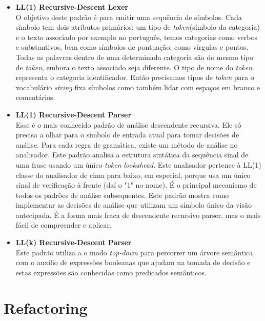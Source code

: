 \begin{itemize}
	\item \textbf{LL(1) Recursive-Descent Lexer}\\
	O objetivo deste padr\~{a}o \'{e} para emitir uma sequência de s\'{i}mbolos. Cada s\'{i}mbolo tem dois atributos prim\'{a}rios: um tipo de \textit{token}(s\'{i}mbolo da categoria) e o texto associado por exemplo 
	no português, temos categorias como verbos e substantivos, bem como s\'{i}mbolos de pontuaç\~{a}o, como v\'{i}rgulas e pontos. Todas as palavras dentro de uma determinada categoria s\~{a}o do mesmo tipo de \textit{token}, embora o texto associado seja diferente. O tipo de nome do \textit{token} representa o categoria identificador. Ent\~{a}o precisamos tipos de \textit{token} para o vocabul\'{a}rio \textit{string} fixa s\'{i}mbolos como tamb\'{e}m lidar com espaços em branco e coment\'{a}rios.
	\item \textbf{LL(1) Recursive-Descent Parser}\\
	Esse \'{e} o mais conhecido padr\~{a}o de an\'{a}lise descendente recursiva. Ele s\'{o} precisa	a olhar para o s\'{i}mbolo de entrada atual para tomar decis\~{o}es de an\'{a}lise. Para cada regra de gram\'{a}tica, existe um m\'{e}todo de an\'{a}lise no analisador. Este padr\~{a}o analisa a estrutura sint\'{a}tica da sequência sinal de uma frase usando um \'{u}nico \textit{token} \textit{lookahead}. Este analisador pertence à LL(1) classe do analisador de cima para baixo, em especial, porque usa um \'{u}nico sinal de verificaç\~{a}o à frente (da\'{i} o "1" no nome). É o principal mecanismo de todos os padr\~{o}es de an\'{a}lise subsequentes. Este padr\~{a}o mostra como implementar as decis\~{o}es de an\'{a}lise que utilizam um s\'{i}mbolo \'{u}nico da vis\~{a}o antecipada. É a forma mais fraca de descendente recursivo parser, mas o mais f\'{a}cil de compreender e aplicar.
	\item \textbf{LL(k) Recursive-Descent Parser}\\
	Este padr\~{a}o utiliza a o modo \textit{top-down} para percorrer um \'{a}rvore sem\^{a}ntica com o aux\'{i}lio de express\~{o}es booleanas que ajudam na tomada de decis\~{a}o e estas express\~{o}es s\~{a}o conhecidas como predicados sem\^{a}nticos.
	
\end{itemize}




\section{Refactoring}\label{sec:refactoring}

